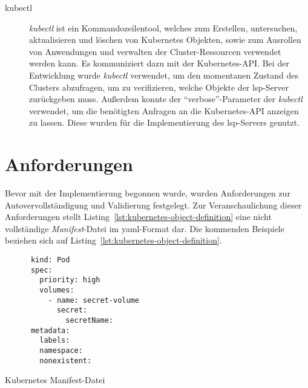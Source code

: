 \begin{description}
      \item[kubectl]
            \textit{kubectl} ist ein Kommandozeilentool, welches zum Erstellen, untersuchen, aktualisieren und löschen von Kubernetes Objekten, sowie zum Ausrollen
            von Anwendungen und verwalten der Cluster-Ressourcen verwendet werden kann. Es kommuniziert dazu mit der Kubernetes-API.\@
            Bei der Entwicklung wurde \textit{kubectl} verwendet, um den momentanen Zustand des Clusters abzufragen,
            um zu verifizieren, welche Objekte der \ac{lsp}-Server zurückgeben muss.
            Außerdem konnte der ``verbose''-Parameter der \textit{kubectl} verwendet, um die benötigten Anfragen an die Kubernetes-API anzeigen zu lassen.
            Diese wurden für die Implementierung des \ac{lsp}-Servers genutzt.
\end{description}

\section{Anforderungen}\label{sec:requirements}

Bevor mit der Implementierung begonnen wurde, wurden Anforderungen zur Autovervollständigung und Validierung festgelegt. Zur Veranschaulichung
dieser Anforderungen stellt Listing~\ref{lst:kubernetes-object-definition} eine nicht vollständige \textit{Manifest}-Datei im \ac{yaml}-Format dar.
Die kommenden Beispiele beziehen sich auf Listing~\ref{lst:kubernetes-object-definition}.

\begin{listing}[htp]
      \begin{verbatim}
      kind: Pod
      spec: 
        priority: high
        volumes: 
          - name: secret-volume
            secret: 
              secretName: 
      metadata: 
        labels: 
        namespace:
        nonexistent:
      \end{verbatim}
      \caption{Kubernetes Manifest-Datei}
      \label{lst:kubernetes-object-definition}
\end{listing}

